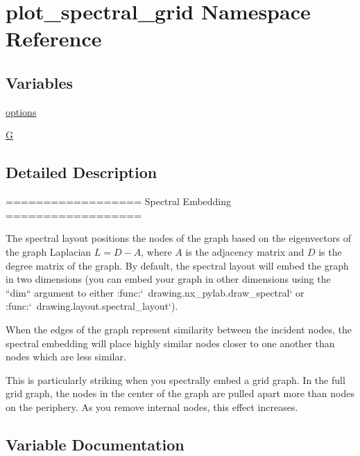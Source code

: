 \hypertarget{namespaceplot__spectral__grid}{}\section{plot\+\_\+spectral\+\_\+grid Namespace Reference}
\label{namespaceplot__spectral__grid}
\subsection*{Variables}
\begin{DoxyCompactItemize}
\item 
\hyperlink{namespaceplot__spectral__grid_a400e3ca3ba7676e918708c5bb4dfdc83}{options}
\item 
\hyperlink{namespaceplot__spectral__grid_a6571da1bdc3ad003985b718ebe5b9908}{G}
\end{DoxyCompactItemize}


\subsection{Detailed Description}
\begin{DoxyVerb}==================
Spectral Embedding
==================

The spectral layout positions the nodes of the graph based on the
eigenvectors of the graph Laplacian $L = D - A$, where $A$ is the
adjacency matrix and $D$ is the degree matrix of the graph.
By default, the spectral layout will embed the graph in two
dimensions (you can embed your graph in other dimensions using the
``dim`` argument to either :func:`~drawing.nx_pylab.draw_spectral` or
:func:`~drawing.layout.spectral_layout`).

When the edges of the graph represent similarity between the incident
nodes, the spectral embedding will place highly similar nodes closer
to one another than nodes which are less similar.

This is particularly striking when you spectrally embed a grid
graph.  In the full grid graph, the nodes in the center of the
graph are pulled apart more than nodes on the periphery.
As you remove internal nodes, this effect increases.
\end{DoxyVerb}
 

\subsection{Variable Documentation}
\mbox{\label{namespaceplot__spectral__grid_a6571da1bdc3ad003985b718ebe5b9908}} 
